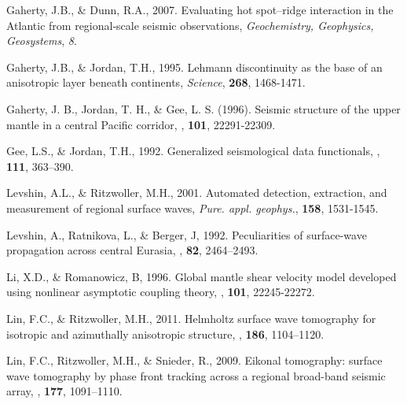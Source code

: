 \documentclass[referee]{gji}
\begin{document}
\begin{thebibliography}{}
	   Gaherty, J.B., \& Dunn, R.A., 2007. Evaluating hot spot–ridge interaction in the Atlantic from regional‐scale seismic observations, \textit{Geochemistry, Geophysics, Geosystems}, \textit{8}.

	   Gaherty, J.B., \& Jordan, T.H., 1995. Lehmann discontinuity as the base of an anisotropic layer beneath continents, \textit{Science}, \textbf{268}, 1468-1471.

	   Gaherty, J. B., Jordan, T. H., \& Gee, L. S. (1996). Seismic structure of the upper mantle in a central Pacific corridor, \textit{\jgr}, \textbf{101}, 22291-22309.

	   Gee, L.S., \& Jordan, T.H., 1992. Generalized seismological data functionals, \textit{\gji}, \textbf{111}, 363–390.


	   Levshin, A.L., \& Ritzwoller, M.H., 2001. Automated detection, extraction, and measurement of regional surface waves, \textit{Pure. appl. geophys.}, \textbf{158}, 1531-1545.

	   Levshin, A., Ratnikova, L., \& Berger, J, 1992. Peculiarities of surface-wave propagation across central Eurasia, \textit{\bssa}, \textbf{82}, 2464–2493.

	   Li, X.D., \& Romanowicz, B, 1996. Global mantle shear velocity model developed using nonlinear asymptotic coupling theory, \textit{\jgr}, \textbf{101}, 22245-22272.

	   Lin, F.C., \& Ritzwoller, M.H., 2011. Helmholtz surface wave tomography for isotropic and azimuthally anisotropic structure, \textit{\gji}, \textbf{186}, 1104–1120.

	   Lin, F.C., Ritzwoller, M.H., \& Snieder, R., 2009. Eikonal tomography: surface wave tomography by phase front tracking across a regional broad-band seismic array, \textit{\gji}, \textbf{177}, 1091–1110. 


\end{thebibliography}
\end{document}
